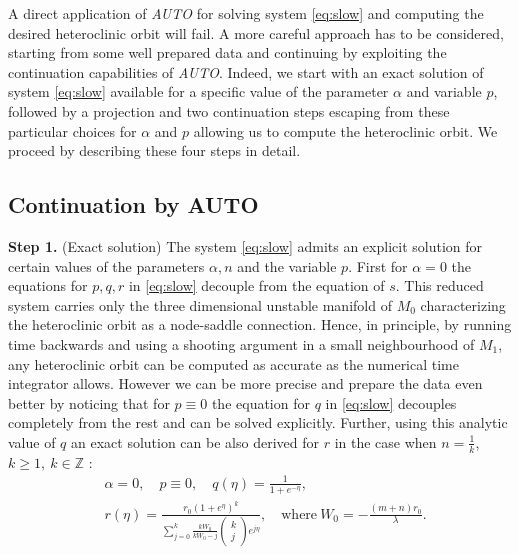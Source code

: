 \documentclass[usletter,11pt]{article}
\theoremstyle{remark}
\begin{document}
A direct application of \emph{AUTO} for solving system \eqref{eq:slow} and computing the desired  heteroclinic orbit will fail. A more careful approach has to be considered, starting from some well prepared data and continuing by exploiting the continuation capabilities of \emph{AUTO}. 
Indeed, we start with an exact solution of system  \eqref{eq:slow} available for  a specific value of the parameter $\alpha$ and variable $p$, followed by a projection and two continuation steps escaping from these particular choices for $\alpha$ and $p$ allowing us to  compute the heteroclinic orbit. 
We proceed by describing these four steps in detail. 


\subsection{Continuation by AUTO}\label{sec:contauto}

{\bf Step 1.} (Exact solution) The system \eqref{eq:slow} admits an explicit solution for certain values of the parameters $\alpha, n$ and the variable $p$. First for $\alpha=0$  the equations for $p, q, r$ in \eqref{eq:slow} decouple from the equation of $s$. This reduced system carries only the three dimensional unstable manifold of $M_0$ characterizing the heteroclinic orbit as a node-saddle connection. Hence, in principle, by running time backwards and using a shooting argument in a small neighbourhood of $M_1$, any heteroclinic orbit can be computed as accurate as the numerical time integrator allows. However we can be more precise and prepare the data even better by 
noticing that for $p\equiv 0$ the equation for $q$ in \eqref{eq:slow} decouples completely from the rest and can be solved explicitly. Further, using this analytic value of $q$ an exact solution can be also derived for $r$ in the case when $\displaystyle n=\frac{1}{k}$, $k \ge 1, \ k\in \mathbb{Z}$ :  
\begin{equation}
\label{exa0p0}
\begin{aligned}
 &\alpha=0, \quad p\equiv0, \quad q(\eta) = \frac{1}{1+e^{-\eta}},\\
 & r(\eta) = \frac{r_0 \left(1 + e^{\eta}\right)^k}{ \displaystyle \sum_{j=0}^k \frac{kW_0}{kW_0 -j}\begin{pmatrix} k\\j\end{pmatrix} e^{j\eta}} , \quad \text{where}\ W_0= - \frac{(m+n)r_0}{\lambda}.
\end{aligned}
\end{equation}
\end{document}
